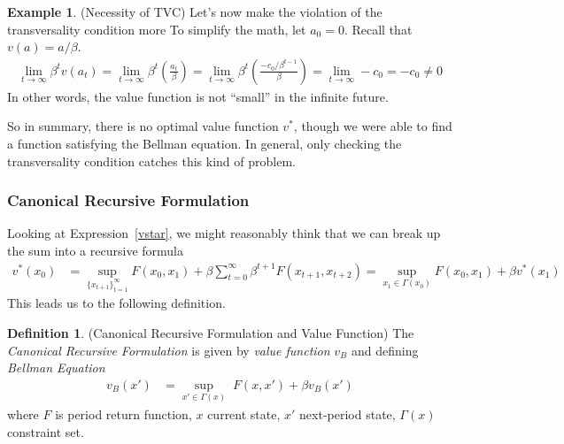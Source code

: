 \documentclass[12pt]{book}
\numberwithin{equation}{section} %
\theoremstyle{plain}
\theoremstyle{definition}
\newtheorem{defn}[thm]{Definition}
\newtheorem{ex}[thm]{Example}
\theoremstyle{remark}
\begin{document}
\begin{ex}{(Necessity of TVC)}
Let's now make the violation of the transversality condition more
To simplify the math, let $a_0=0$. Recall that $v(a) = a/\beta$.
\begin{align*}
  \lim_{t\rightarrow\infty} \beta^t v(a_t)
  = \lim_{t\rightarrow\infty} \beta^t \left(\frac{a_t}{\beta}\right)
  = \lim_{t\rightarrow\infty} \beta^t
  \left(
  \frac{-c_0/\beta^{t-1}}{\beta}
  \right)
  = \lim_{t\rightarrow\infty}
  -c_0
  = -c_0 \neq 0
\end{align*}
In other words, the value function is not ``small'' in the infinite
future.

So in summary, there is no optimal value function $v^*$, though we were
able to find a function satisfying the Bellman equation. In general,
only checking the transversality condition catches this kind of problem.
\end{ex}


\clearpage
\subsubsection{Canonical Recursive Formulation}

Looking at Expression~\ref{vstar}, we might reasonably think that we can
break up the sum into a recursive formula
\begin{align*}
  v^*(x_0)
  &=
  \sup_{\{x_{t+1}\}^\infty_{t=1}}
  F(x_0,x_1) +
  \beta \sum^\infty_{t=0} \beta^{t+1} F(x_{t+1},x_{t+2})
  =
  \sup_{x_1\in\Gamma(x_0)}
  F(x_0,x_1) +
  \beta v^*(x_1)
\end{align*}
This leads us to the following definition.

\begin{defn}{(Canonical Recursive Formulation and Value Function)}
\label{defn:bellman}
The \emph{Canonical Recursive Formulation} is given by
\emph{value function} $v_B$ and defining \emph{Bellman Equation}
\begin{align}
  \label{eq:vB}
  v_B(x') &=
  \sup_{x'\in\Gamma(x)}\;
  F(x,x') +
  \beta v_B(x')
\end{align}
where $F$ is period return function, $x$ current state,
$x'$ next-period state, $\Gamma(x)$ constraint set.
\end{defn}
\end{document}
